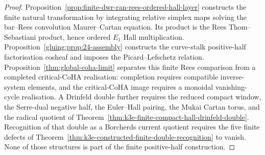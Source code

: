 \begin{proof}
Proposition~\ref{prop:finite-dwr-ran-rees-ordered-hall-layer} constructs
the finite natural transformation by integrating relative simplex maps
solving the bar--Rees convolution Maurer--Cartan equation. Its product
is the Rees Thom--Sebastiani product, hence ordered \(E_1\) Hall
multiplication. Proposition~\ref{gluing:prop:24-assembly} constructs
the curve-stalk positive-half factorisation cosheaf and imposes the
Picard--Lefschetz relation. Proposition~\ref{thm:global-coha-limit}
separates this finite Rees comparison from a completed critical-CoHA
realisation: completion requires compatible inverse-system elements,
and the critical-CoHA image requires a monoidal vanishing-cycle
realisation. A Drinfeld double further requires the reduced compact
window, the Serre-dual negative half, the Euler--Hall pairing, the
Mukai Cartan torus, and the radical quotient of
Theorem~\ref{thm:k3e-finite-compact-hall-drinfeld-double}. Recognition
of that double as a Borcherds current quotient requires the five
finite defects of
Theorem~\ref{thm:k3e-constructed-finite-double-recognition} to vanish.
None of those structures is part of the finite positive-half
construction.
\end{proof}

